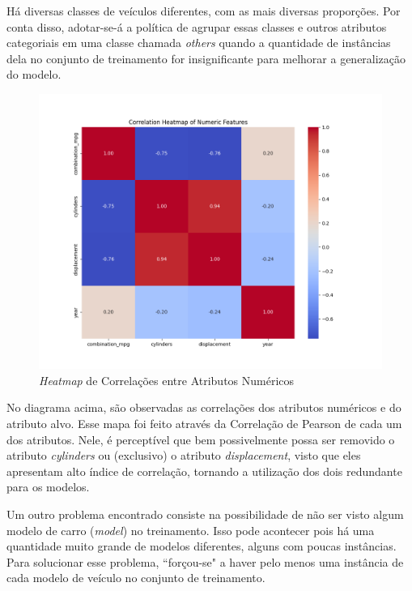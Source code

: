 \documentclass{report}
\begin{document}
Há diversas classes de veículos diferentes, com as mais diversas proporções. Por conta disso, adotar-se-á a política de agrupar essas classes e outros atributos
categoriais em uma classe chamada \textit{others} quando a quantidade de instâncias dela no conjunto de treinamento for insignificante para melhorar a generalização do modelo.

\begin{figure}[h!]
  \centering
  \includegraphics[width=\linewidth]{images/plots/num_heatmap.png}
  \caption{\label{img:num_heatmat} \textit{Heatmap} de Correlações entre Atributos Numéricos}
\end{figure}

No diagrama acima, são observadas as correlações dos atributos numéricos e do atributo alvo. Esse mapa foi feito através da Correlação de Pearson de cada um dos atributos.
Nele, é perceptível que bem possivelmente possa ser removido o atributo \textit{cylinders} ou (exclusivo) o atributo \textit{displacement}, visto que eles apresentam alto
índice de correlação, tornando a utilização dos dois redundante para os modelos.

Um outro problema encontrado consiste na possibilidade de não ser visto algum modelo de carro (\textit{model}) no treinamento. 
Isso pode acontecer pois há uma quantidade muito grande de modelos diferentes, alguns com poucas instâncias.
Para solucionar esse problema, ``forçou-se" a haver pelo menos uma instância de cada modelo de veículo no conjunto de treinamento.

\clearpage
\thispagestyle{empty}
\end{document}
